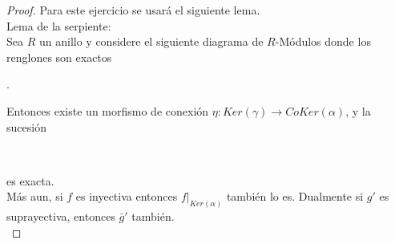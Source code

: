 \documentclass{article}
\begin{document}
\begin{enumerate}[label=\textbf{Ej \arabic*.}]
\begin{proof}
			 Para este ejercicio se usará el siguiente lema.\\
			Lema de la serpiente:\\
			Sea $R$ un anillo y considere el siguiente diagrama de $R$-Módulos donde los renglones son exactos
			
			\begin{center}
				.
			\end{center}
			Entonces existe un morfismo de conexión $\eta\colon Ker(\gamma)\longrightarrow CoKer(\alpha)$, y la sucesión \quad
			\\
			es exacta.\\
			Más aun, si $f$ es inyectiva entonces $f|_{Ker(\alpha)}$ también lo es. Dualmente si $g'$ es suprayectiva, entonces $\bar{g}'$ también.\\
			

\end{proof}
\end{enumerate}
\end{document}
